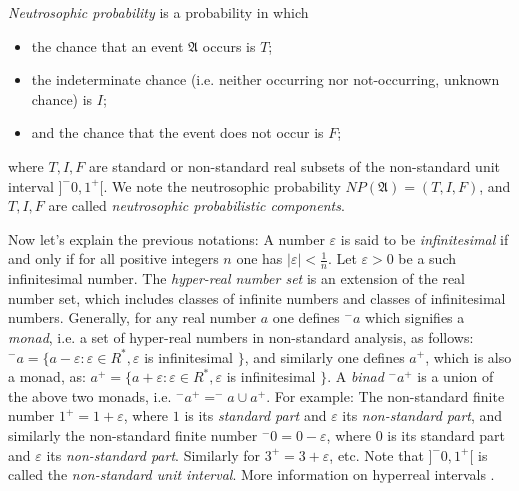 \documentclass[12pt]{article}
\begin{document}
\emph{Neutrosophic probability} is a probability in which 
\begin{itemize}
\item the chance that an event $\mathfrak{A}$ occurs is $T$;
\item the indeterminate chance (i.e. neither occurring nor not-occurring, unknown chance) is $I$;
\item and the chance that the event does not occur is $F$;
\end{itemize}
where $T, I, F$ are standard or non-standard real subsets of the non-standard unit interval $]^-0, 1^+[$.
\newline We note the neutrosophic probability $NP(\mathfrak{A}) = (T, I, F)$, and $T, I, F$ are called \emph{neutrosophic probabilistic components}.

Now let's explain the previous notations:
\newline A number $\varepsilon$ is said to be \emph{infinitesimal} if and only if for all positive integers $n$ one has $|\varepsilon| < \frac{1}{n}$.  Let $\varepsilon > 0$ be a such infinitesimal number.  The \emph{hyper-real number set} is an  extension of the real number set, which includes classes of infinite numbers and classes of infinitesimal numbers.  
\newline Generally, for any real number $a$ one defines $^-a$ which signifies a \emph{monad}, i.e. a set of hyper-real numbers in non-standard analysis, as follows:
\newline $^-a = \{a-\varepsilon: \varepsilon \in R^*, \varepsilon$ is infinitesimal $\}$,
\newline and similarly one defines $a^+$, which is also a monad, as:
\newline $a^+ = \{a+\varepsilon: \varepsilon \in R^*, \varepsilon$ is infinitesimal $\}$.
\newline A \emph{binad} $^-a^+$ is a union of the above two monads, i.e.
\newline $ ^-a^+ = ^-a \cup a^+$.
\newline For example: The non-standard finite number $1^+ = 1+\varepsilon$, where $1$ is its \emph{standard part} and $\varepsilon$ its \emph{non-standard part}, and similarly the non-standard finite number $^-0 = 0-\varepsilon$, where $0$ is its standard part and $\varepsilon$ its \emph{non-standard part}.
\newline Similarly for $3^+ = 3+ \varepsilon$, etc.
\newline Note that $] ^-0, 1^+ [$ is called the \emph{non-standard unit interval}.  
\newline More information on hyperreal intervals .
\end{document}
